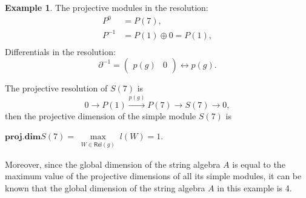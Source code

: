 \documentclass[11pt]{amsart}
\numberwithin{equation}{section}
\theoremstyle{definition}
\newtheorem{example}[theorem]{Example}
\begin{document}
\begin{example}
	The projective modules in the resolution: 
	\[
	\begin{aligned}
		P^0    &=  P(7), \\
		P^{-1} &=  P(1) \oplus 0 = P(1), \\
	\end{aligned}
	\]
	Differentials in the resolution:
	\[
	\partial^{-1} = \begin{pmatrix} p(g) & 0 \end{pmatrix} \longleftrightarrow p(g).
	\]
	
	The projective resolution of \( S(7) \) is
	\[
	0 \to P(1) \xrightarrow{p(g)} P(7) \to S(7) \to 0,
	\]
	then the projective dimension of the simple module \( S(7) \) is 
	\begin{center}
		\( \textbf{proj.dim}S(7) = \max\limits_{\substack{W \in \mathsf{Rel}(g)}} l(W) = 1 \).
	\end{center}
	
	Moreover, since the global dimension of the string algebra \( A \) is equal to the maximum value of the projective dimensions of all its simple modules, it can be known that the global dimension of the string algebra \( A \) in this example is 4.
	
	
	
	
	
	
\end{example}
\end{document}
